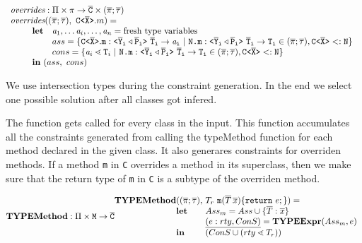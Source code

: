 \documentclass[a4paper,USenglish,cleveref, autoref, thm-restate]{lipics-v2021}
\begin{document}
\noindent
$\begin{array}{l}
\overridesFunc{} : \typeAssumptionsSymbol \times \methodAssumption \to \consSet \times \typeAssumptions \\
\overridesFunc{}(\typeAssumptions,\ \exptype{C}{\ol{X}}.m) = \\
\quad \quad \begin{array}{ll}
\textbf{let}& \tv{a}_1, \ldots \tv{a}_i, \ldots, \tv{a}_n = \text{fresh type variables} \\
& ass = \set{ \exptype{C}{\ol{X}}.\mathtt{m} : \mathtt{\exptype{}{\ol{Y}_i \triangleleft \ol{P}_i}\ \ol{T}_i \to \tv{a}_i}
\ |\ \mathtt{\texttt{N.m} : \exptype{}{\ol{Y}_i \triangleleft \ol{P}_i}\ \ol{T}_i \to T_i} \in \typeAssumptions, \exptype{C}{\ol{X}} <: \texttt{N}} \\
& cons = \set{ \tv{a}_i \lessdot \type{T}_i \ |\ \mathtt{\texttt{N.m} : \exptype{}{\ol{Y}_i \triangleleft \ol{P}_i}\ \ol{T}_i \to T_i} \in \typeAssumptions, \exptype{C}{\ol{X}} <: \texttt{N}} \\
\multicolumn{2}{l}{\textbf{in}\ (ass,\ cons)} \\
\end{array}\\
\end{array}
$

We use intersection types during the constraint generation.
In the end we select one possible solution after all classes got infered.

The \fjtype function gets called for every class in the input.
This function accumulates all the constraints generated from calling the
typeMethod function for each method declared in the given class.
It also generares constraints for overriden methods.
If a method \texttt{m} in \texttt{C} overrides a method in its superclass,
then we make sure that the return type of \texttt{m} in \texttt{C} is a subtype of the overriden method.

\noindent
$\typeMethod: \typeAssumptionsSymbol \times
\texttt{M} \rightarrow \ol{C}\\
\begin{array}{@{}l@{}l@{}l}
\typeMethod & (\typeAssumptions,\ & T_r \ \mathtt{m}(\overline{T} \, \overline{x})\{ \mathtt{ return }\ e; \}) =\\
& \textbf{let}
& Ass_m = Ass \cup \{ \overline{T} : \overline{x} \}\\
& & \underline{(e:rty, ConS)} = \typeExpr(Ass_m, e)\\
& \mathbf{in}
& (ConS \cup (rty \lessdot T_r))\\
\end{array}
$
\end{document}
